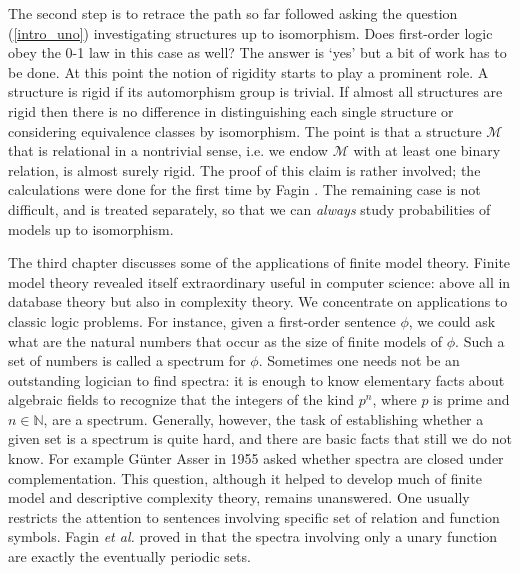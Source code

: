 The second step is to retrace the path so far followed asking the question (\ref{intro_uno}) investigating structures up to isomorphism. 
Does first-order logic obey the 0-1 law in this case as well? The answer is `yes' but a bit of work has to be done. 
At this point the notion of rigidity starts to play a prominent role. 
A structure is rigid if its automorphism group is trivial. 
If almost all structures are rigid then there is no difference in distinguishing each single structure or considering equivalence classes by isomorphism. 
The point is that a structure $\mathcal{M}$ that is relational in a nontrivial sense, i.e. we endow $\mathcal{M}$ with at least one binary relation, is almost surely rigid. 
The proof of this claim is rather involved; the calculations were done for the first time by Fagin \cite{fagin_rel}. 
The remaining case is not difficult, and is treated separately, so that we can \emph{always} study probabilities of models up to isomorphism. 

The third chapter discusses some of the applications of finite model theory. 
Finite model theory revealed itself extraordinary useful in computer science: above all in database theory but also in complexity theory. 
We concentrate on applications to classic logic problems. 
For instance, given a first-order sentence $\phi$, we could ask what are the natural numbers that occur as the size of finite models of $\phi$. 
Such a set of numbers is called a spectrum for $\phi$. 
Sometimes one needs not be an outstanding logician to find spectra: it is enough to know elementary facts about algebraic fields to recognize that the integers of the kind $p^n$, where $p$ is prime and $n\in \mathbb{N}$, are a spectrum. 
Generally, however, the task of establishing whether a given set is a spectrum is quite hard, and there are basic facts that still we do not know. 
For example G\"unter Asser in 1955 asked whether spectra are closed under complementation. 
This question, although it helped to develop much of finite model and descriptive complexity theory, remains unanswered. 
One usually restricts the attention to sentences involving specific set of relation and function symbols. 
Fagin \emph{et al.} proved in \cite{spectra1} that the spectra involving only a unary function are exactly the eventually periodic sets. 

